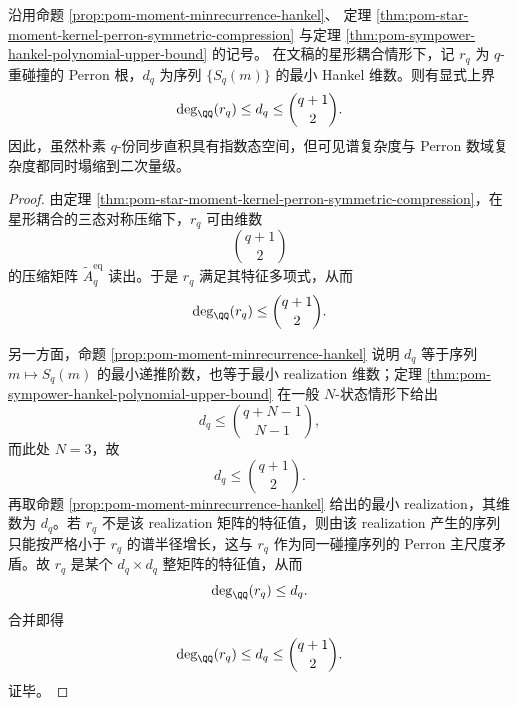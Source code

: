 \begin{theorem}[星形 \(q\)-碰撞谱的代数次数至多二次增长]\label{thm:xi-time-part9zo-star-perron-degree-quadratic}
沿用命题 \ref{prop:pom-moment-minrecurrence-hankel}、
定理 \ref{thm:pom-star-moment-kernel-perron-symmetric-compression}
与定理 \ref{thm:pom-sympower-hankel-polynomial-upper-bound} 的记号。
在文稿的星形耦合情形下，记 \(r_q\) 为 \(q\)-重碰撞的 Perron 根，\(d_q\) 为序列 \(\{S_q(m)\}\) 的最小 Hankel 维数。则有显式上界
\[
\deg_{\QQ}(r_q)\le d_q\le \binom{q+1}{2}.
\]
因此，虽然朴素 \(q\)-份同步直积具有指数态空间，但可见谱复杂度与 Perron 数域复杂度都同时塌缩到二次量级。
\end{theorem}
\begin{proof}
由定理 \ref{thm:pom-star-moment-kernel-perron-symmetric-compression}，在星形耦合的三态对称压缩下，\(r_q\) 可由维数
\[
\binom{q+1}{2}
\]
的压缩矩阵 \(\widetilde A_q^{\mathrm{eq}}\) 读出。于是 \(r_q\) 满足其特征多项式，从而
\[
\deg_{\QQ}(r_q)\le \binom{q+1}{2}.
\]

另一方面，命题 \ref{prop:pom-moment-minrecurrence-hankel} 说明 \(d_q\) 等于序列 \(m\mapsto S_q(m)\) 的最小递推阶数，也等于最小 realization 维数；定理 \ref{thm:pom-sympower-hankel-polynomial-upper-bound} 在一般 \(N\)-状态情形下给出
\[
d_q\le \binom{q+N-1}{N-1},
\]
而此处 \(N=3\)，故
\[
d_q\le \binom{q+1}{2}.
\]
再取命题 \ref{prop:pom-moment-minrecurrence-hankel} 给出的最小 realization，其维数为 \(d_q\)。若 \(r_q\) 不是该 realization 矩阵的特征值，则由该 realization 产生的序列只能按严格小于 \(r_q\) 的谱半径增长，这与 \(r_q\) 作为同一碰撞序列的 Perron 主尺度矛盾。故 \(r_q\) 是某个 \(d_q\times d_q\) 整矩阵的特征值，从而
\[
\deg_{\QQ}(r_q)\le d_q.
\]
合并即得
\[
\deg_{\QQ}(r_q)\le d_q\le \binom{q+1}{2}.
\]
证毕。
\end{proof}

